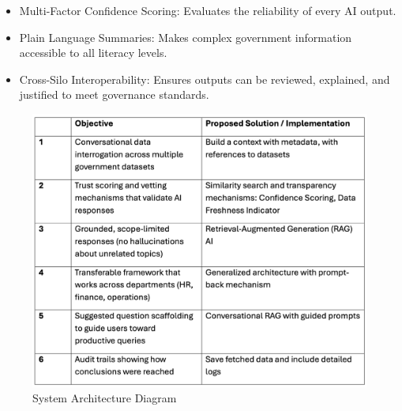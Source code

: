 

\begin{itemize}
    \item Multi-Factor Confidence Scoring: Evaluates the reliability of every AI output.
    \item Plain Language Summaries: Makes complex government information
    accessible to all literacy levels.
    \item Cross-Silo Interoperability: Ensures outputs can be reviewed, explained, and
    justified to meet governance standards.
\end{itemize}

\clearpage
{}

\begin{figure}[h]
    \centering
    \includegraphics[width=0.75\linewidth]{img/images2}
    \caption{System Architecture Diagram}
\end{figure}



